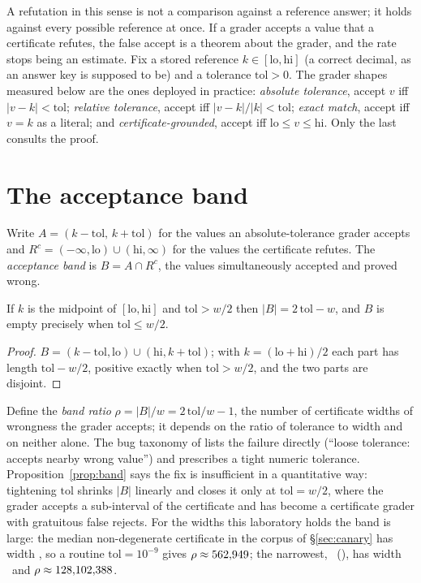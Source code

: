 \documentclass[11pt]{article}
\theoremstyle{definition}
\newcommand{\tol}{\mathrm{tol}}
\newcommand{\lo}{\mathrm{lo}}
\newcommand{\hi}{\mathrm{hi}}
\begin{document}
A refutation in this sense is not a comparison against a reference answer; it holds against every possible reference at once. If a grader accepts a value that a certificate refutes, the false accept is a theorem about the grader, and the rate stops being an estimate. Fix a stored reference $k\in[\lo,\hi]$ (a correct decimal, as an answer key is supposed to be) and a tolerance $\tol>0$. The grader shapes measured below are the ones deployed in practice: \emph{absolute tolerance}, accept $v$ iff $|v-k|<\tol$; \emph{relative tolerance}, accept iff $|v-k|/|k|<\tol$; \emph{exact match}, accept iff $v=k$ as a literal; and \emph{certificate-grounded}, accept iff $\lo\le v\le\hi$. Only the last consults the proof.

\section{The acceptance band}\label{sec:band}

Write $A=(k-\tol,\,k+\tol)$ for the values an absolute-tolerance grader accepts and $R^{c}=(-\infty,\lo)\cup(\hi,\infty)$ for the values the certificate refutes. The \emph{acceptance band} is $B=A\cap R^{c}$, the values simultaneously accepted and proved wrong.

\begin{proposition}\label{prop:band}
If $k$ is the midpoint of $[\lo,\hi]$ and $\tol>w/2$ then $|B|=2\,\tol-w$, and $B$ is empty precisely when $\tol\le w/2$.
\end{proposition}
\begin{proof}
$B=(k-\tol,\lo)\cup(\hi,k+\tol)$; with $k=(\lo+\hi)/2$ each part has length $\tol-w/2$, positive exactly when $\tol>w/2$, and the two parts are disjoint.
\end{proof}

Define the \emph{band ratio} $\rho=|B|/w=2\,\tol/w-1$, the number of certificate widths of wrongness the grader accepts; it depends on the ratio of tolerance to width and on neither alone. The bug taxonomy of \cite{Ray26} lists the failure directly (``loose tolerance: accepts nearby wrong value'') and prescribes a tight numeric tolerance. Proposition~\ref{prop:band} says the fix is insufficient in a quantitative way: tightening $\tol$ shrinks $|B|$ linearly and closes it only at $\tol=w/2$, where the grader accepts a sub-interval of the certificate and has become a certificate grader with gratuitous false rejects. For the widths this laboratory holds the band is large: the median non-degenerate certificate in the corpus of \S\ref{sec:canary} has width \WidthMedian, so a routine $\tol=10^{-9}$ gives $\rho\approx562{,}949$; the narrowest, \NarrowestWhat\ (\texttt{\NarrowestId}), has width \WidthMin\ and $\rho\approx128{,}102{,}388$.
\end{document}
